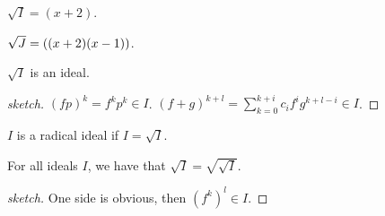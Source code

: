 \begin{example}
$\sqrt{I} = (x + 2)$.
\end{example}
\begin{example}
$\sqrt{J} = \left( ( x+2) (x -1) \right)$.
\end{example}

\begin{proposition}
$\sqrt{I}$ is an ideal.
\end{proposition}

\begin{proof}[sketch]
$(fp)^k = f^k p^k \in I$. $(f+g)^{k+l} = \sum_{k=0}^{k+i} c_i f^i g^{k+l -i} \in I $.
\end{proof}

\begin{definition}
$I$ is a radical ideal if $I = \sqrt{I}$.
\end{definition}

\begin{proposition}
For all ideals $I$, we have that $\sqrt{I} = \sqrt{\sqrt{I}}$.
\end{proposition}

\begin{proof}[sketch]
One side is obvious, then $(f^k)^l \in I$.
\end{proof}







